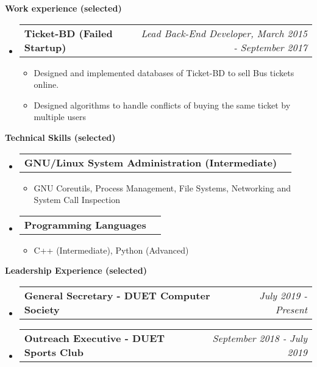 \documentclass[letterpaper,10pt]{article}
\makeatletter
\newcommand{\resheading}[1]{{\large \colorbox{mygrey}{\begin{minipage}{\textwidth}{\textbf{#1 \vphantom{p\^{E}}}}\end{minipage}}}}
\newcommand{\ressubheading}[4]{
	\begin{tabular*}{7.0in}{l@{\extracolsep{\fill}}r}
		\textbf{#1} & \textit{#4} \\
	\end{tabular*}\vspace{-6pt}}
\makeatother
\begin{document}
	
	\vspace{0.3in}
	
	\resheading{Work experience (selected)}
	\begin{itemize}
		\item \ressubheading{Ticket-BD (Failed Startup)}{}{}{Lead Back-End Developer, March 2015 - September 2017}
		\begin{itemize}
			\item Designed and implemented databases of Ticket-BD to sell Bus tickets online.
			\item Designed algorithms to handle conflicts of buying the same ticket by multiple users 
		\end{itemize}
		
	\end{itemize}


	\vspace{0.3in}
	
	\resheading{Technical Skills (selected)}
	\begin{itemize}
		
		\item \ressubheading{GNU/Linux System Administration (Intermediate) }{}{}{}
		\begin{itemize}
			\item GNU Coreutils, Process Management, File Systems, Networking and System Call Inspection
			
		\end{itemize}
	
		\item \ressubheading{Programming Languages}{}{}{}
		\begin{itemize}
			\item C++ (Intermediate), Python (Advanced)
		
		\end{itemize}
			
		\end{itemize}
	
	\vspace{0.3in}
	
	\resheading{Leadership Experience (selected)}
	\begin{itemize}
		\item \ressubheading{General Secretary - DUET Computer Society}{}{}{July 2019 - Present}
		\item \ressubheading{Outreach Executive - DUET Sports Club}{}{}{September 2018 - July 2019}
		
	\end{itemize}
\end{document}
